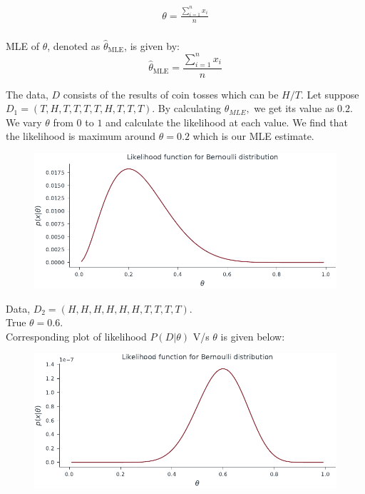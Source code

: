 \documentclass[handout]{beamer}
\begin{document}
\begin{frame}
        
    \begin{align*}
        \theta=\frac{\sum_{i=1}^n x_{i}}{n}\\
    \end{align*}
    \begin{tcolorbox}[colback=metropolisblue!5,colframe=metropolisblue,title=Maximum Likelihood Estimate for $\theta$]
        MLE of $\theta$, denoted as $\hat{\theta}_{\text{MLE}}$, is given by:
        \begin{equation*}
            \hat{\theta}_{\text{MLE}} = \frac{\sum_{i=1}^n x_{i}}{n}
        \end{equation*}
    \end{tcolorbox}
    
    \end{frame}

\begin{frame}
The data, $D$ consists of the results of coin tosses which can be $H/T.$ Let suppose $D_1 = (T,H,T,T,T,T,H,T,T,T).$ By calculating $\theta_{MLE},$ we get its value as $0.2.$ We vary $\theta$ from $0$ to $1$ and calculate the likelihood at each value. We find that the likelihood is maximum around $\theta=0.2$ which is our MLE estimate.
\begin{figure}
                \centerline{\includegraphics[scale = 0.75]{../figures/mle/bernoulli_likelihood.pdf}}
\end{figure}
    
\end{frame}
\begin{frame}
    Data, $D_2 = (H,H,H,H,H,H,T,T,T,T)$. \\True $\theta=0.6.$ \\Corresponding plot of likelihood $P(D|\theta)$ V/s $\theta$ is given below:
    \begin{figure}
                \centerline{\includegraphics[scale = 0.75]{../figures/mle/bernoulli_likelihood_1.pdf}}
\end{figure}
\end{frame}
\end{document}
